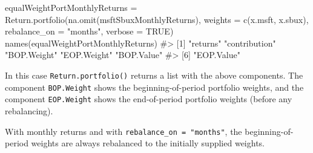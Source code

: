 \documentclass[
  letterpaper,
  DIV=11,
  numbers=noendperiod]{scrreprt}
\newenvironment{Shaded}{\begin{snugshade}}{\end{snugshade}}
\newcommand{\AttributeTok}[1]{\textcolor[rgb]{0.40,0.45,0.13}{#1}}
\newcommand{\CommentTok}[1]{\textcolor[rgb]{0.37,0.37,0.37}{#1}}
\newcommand{\ConstantTok}[1]{\textcolor[rgb]{0.56,0.35,0.01}{#1}}
\newcommand{\DecValTok}[1]{\textcolor[rgb]{0.68,0.00,0.00}{#1}}
\newcommand{\FunctionTok}[1]{\textcolor[rgb]{0.28,0.35,0.67}{#1}}
\newcommand{\NormalTok}[1]{\textcolor[rgb]{0.00,0.23,0.31}{#1}}
\newcommand{\OtherTok}[1]{\textcolor[rgb]{0.00,0.23,0.31}{#1}}
\newcommand{\SpecialCharTok}[1]{\textcolor[rgb]{0.37,0.37,0.37}{#1}}
\newcommand{\StringTok}[1]{\textcolor[rgb]{0.13,0.47,0.30}{#1}}
\theoremstyle{definition}
\theoremstyle{definition}
\theoremstyle{remark}
\begin{document}
\begin{Shaded}
\begin{Highlighting}[]
\NormalTok{equalWeightPortMonthlyReturns }\OtherTok{=} 
  \FunctionTok{Return.portfolio}\NormalTok{(}\FunctionTok{na.omit}\NormalTok{(msftSbuxMonthlyReturns),}
                   \AttributeTok{weights =} \FunctionTok{c}\NormalTok{(x.msft, x.sbux),}
                   \AttributeTok{rebalance\_on =} \StringTok{"months"}\NormalTok{,}
                   \AttributeTok{verbose =} \ConstantTok{TRUE}\NormalTok{)}
\FunctionTok{names}\NormalTok{(equalWeightPortMonthlyReturns)}
\CommentTok{\#\textgreater{} [1] "returns"      "contribution" "BOP.Weight"   "EOP.Weight"   "BOP.Value"   }
\CommentTok{\#\textgreater{} [6] "EOP.Value"}
\end{Highlighting}
\end{Shaded}

In this case \texttt{Return.portfolio()} returns a list with the above
components. The component \texttt{BOP.Weight} shows the
beginning-of-period portfolio weights, and the component
\texttt{EOP.Weight} shows the end-of-period portfolio weights (before
any rebalancing).

\begin{Shaded}
\end{Shaded}

With monthly returns and with \texttt{rebalance\_on\ =\ "months"}, the
beginning-of-period weights are always rebalanced to the initially
supplied weights.

\begin{Shaded}
\end{Shaded}
\end{document}
